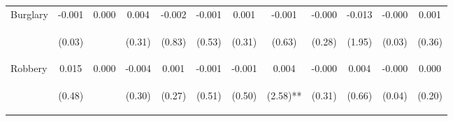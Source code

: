 \begin{tabular}{lccccccccccc}
\noalign{\smallskip}Burglary & -0.001 & 0.000 & 0.004 & -0.002 & -0.001 & 0.001 & -0.001 & -0.000 & -0.013 & -0.000 & 0.001\\
 & \begin{footnotesize}(0.03)\end{footnotesize} & \begin{footnotesize}\end{footnotesize} & \begin{footnotesize}(0.31)\end{footnotesize} & \begin{footnotesize}(0.83)\end{footnotesize} & \begin{footnotesize}(0.53)\end{footnotesize} & \begin{footnotesize}(0.31)\end{footnotesize} & \begin{footnotesize}(0.63)\end{footnotesize} & \begin{footnotesize}(0.28)\end{footnotesize} & \begin{footnotesize}(1.95)\end{footnotesize} & \begin{footnotesize}(0.03)\end{footnotesize} & \begin{footnotesize}(0.36)\end{footnotesize}\\
\noalign{\smallskip}Robbery & 0.015 & 0.000 & -0.004 & 0.001 & -0.001 & -0.001 & 0.004 & -0.000 & 0.004 & -0.000 & 0.000\\
 & \begin{footnotesize}(0.48)\end{footnotesize} & \begin{footnotesize}\end{footnotesize} & \begin{footnotesize}(0.30)\end{footnotesize} & \begin{footnotesize}(0.27)\end{footnotesize} & \begin{footnotesize}(0.51)\end{footnotesize} & \begin{footnotesize}(0.50)\end{footnotesize} & \begin{footnotesize}(2.58)**\end{footnotesize} & \begin{footnotesize}(0.31)\end{footnotesize} & \begin{footnotesize}(0.66)\end{footnotesize} & \begin{footnotesize}(0.04)\end{footnotesize} & \begin{footnotesize}(0.20)\end{footnotesize}\\

\end{tabular}
